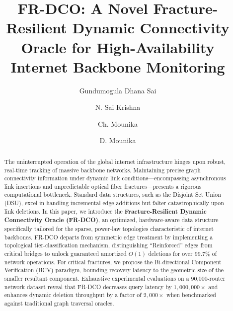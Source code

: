 \documentclass[runningheads]{llncs}
\begin{document}
%
\title{FR-DCO: A Novel Fracture-Resilient Dynamic Connectivity Oracle for High-Availability Internet Backbone Monitoring}


\author{Gundumogula Dhana Sai \and
N. Sai Krishna \and
Ch. Mounika \and
D. Mounika}



\maketitle              

\begin{abstract}
The uninterrupted operation of the global internet infrastructure hinges upon robust, real-time tracking of massive backbone networks. Maintaining precise graph connectivity information under dynamic link conditions—encompassing asynchronous link insertions and unpredictable optical fiber fractures—presents a rigorous computational bottleneck. Standard data structures, such as the Disjoint Set Union (DSU), excel in handling incremental edge additions but falter catastrophically upon link deletions. In this paper, we introduce the \textbf{Fracture-Resilient Dynamic Connectivity Oracle (FR-DCO)}, an optimized, hardware-aware data structure specifically tailored for the sparse, power-law topologies characteristic of internet backbones. FR-DCO departs from symmetric edge treatment by implementing a topological tier-classification mechanism, distinguishing ``Reinforced'' edges from critical bridges to unlock guaranteed amortized $O(1)$ deletions for over 99.7\% of network operations. For critical fractures, we propose the Bi-directional Component Verification (BCV) paradigm, bounding recovery latency to the geometric size of the smaller resultant component. Exhaustive experimental evaluations on a 90,000-router network dataset reveal that FR-DCO decreases query latency by $1,000,000\times$ and enhances dynamic deletion throughput by a factor of $2,000\times$ when benchmarked against traditional graph traversal oracles.

\end{abstract}
\end{document}

